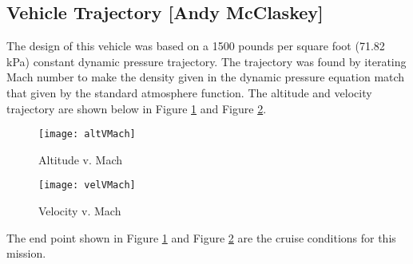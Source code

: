 \subsection{Vehicle Trajectory [Andy McClaskey]}
The design of this vehicle was based on a 1500 pounds per square foot (71.82 kPa) constant dynamic pressure trajectory. The trajectory was found by iterating Mach number to make the density given in the dynamic pressure equation match that given by the standard atmosphere function. The altitude and velocity trajectory are shown below in Figure \ref{fig:altVMach} and Figure \ref{fig:velVMach}.

\begin{figure}[H]
\texttt{[image: altVMach]}
\caption{Altitude v. Mach}
\label{fig:altVMach}
\end{figure}

\begin{figure}[H]
\texttt{[image: velVMach]}
\caption{Velocity v. Mach}
\label{fig:velVMach}
\end{figure}

The end point shown in Figure \ref{fig:altVMach} and Figure \ref{fig:velVMach} are the cruise conditions for this mission.
